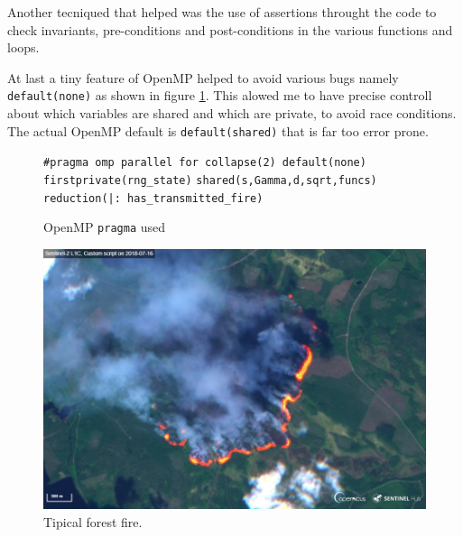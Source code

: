 \documentclass{article}
\begin{document}
Another tecniqued that helped was the use of assertions throught the code to
check invariants, pre-conditions and post-conditions in the various functions
and loops.

At last a tiny feature of OpenMP helped to avoid various bugs namely
\texttt{default(none)} as shown in figure \ref{fig:pragma}. This alowed me to
have precise controll about which variables are shared and which are private, to
avoid race conditions. The actual OpenMP default is \texttt{default(shared)}
that is far too error prone.

\begin{figure}
\centering
\footnotesize
\verb+#pragma omp parallel for collapse(2) default(none) firstprivate(rng_state)+
\verb+shared(s,Gamma,d,sqrt,funcs) reduction(|: has_transmitted_fire)+
\caption{OpenMP \texttt{pragma} used}
\label{fig:pragma}
\end{figure}

\begin{figure}
\centering
\includegraphics[scale=0.2]{fire.jpg}
\caption{Tipical forest fire.}
\label{fig:fire}
\end{figure}
\end{document}
